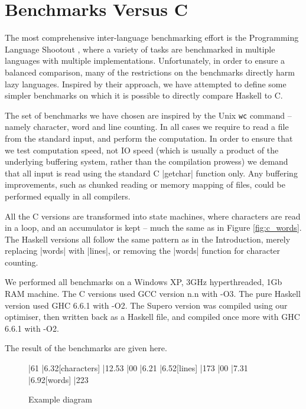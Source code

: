 \documentclass{llncs}
\begin{document}
\section{Benchmarks Versus C}

The most comprehensive inter-language benchmarking effort is the Programming Language Shootout \cite{shootout}, where a variety of tasks are benchmarked in multiple languages with multiple implementations. Unfortunately, in order to ensure a balanced comparison, many of the restrictions on the benchmarks directly harm lazy languages. Inspired by their approach, we have attempted to define some simpler benchmarks on which it is possible to directly compare Haskell to C.

The set of benchmarks we have chosen are inspired by the Unix \texttt{wc} command -- namely character, word and line counting. In all cases we require to read a file from the standard input, and perform the computation. In order to ensure that we test computation speed, not IO speed (which is usually a product of the underlying buffering system, rather than the compilation prowess) we demand that all input is read using the standard C |getchar| function only. Any buffering improvements, such as chunked reading or memory mapping of files, could be performed equally in all compilers.

All the C versions are transformed into state machines, where characters are read in a loop, and an accumulator is kept -- much the same as in Figure \ref{fig:c_words}. The Haskell versions all follow the same pattern as in the Introduction, merely replacing |words| with |lines|, or removing the |words| function for character counting.

We performed all benchmarks on a Windows XP, 3GHz hyperthreaded, 1Gb RAM machine. The C versions used GCC version n.n with -O3. The pure Haskell version used GHC 6.6.1 with -O2. The Supero version was compiled using our optimiser, then written back as a Haskell file, and compiled once more with GHC 6.6.1 with -O2.

The result of the benchmarks are given here.

\begin{figure}[tb]
\begin{center}
\begin{barenv}
 
\bar{6}{1}
\bar{6.3}{2}[characters]
\bar{12.5}{3}
\bar{0}{0}
\bar{6.2}{1}
\bar{6.5}{2}[lines]
\bar{17}{3}
\bar{0}{0}
\bar{7.3}{1}
\bar{6.9}{2}[words]
\bar{22}{3}
\end{barenv}
\vspace{0.5cm}
\begin{barenv}
\end{barenv}
\end{center}
\caption{Example diagram}
\end{figure}
\end{document}

